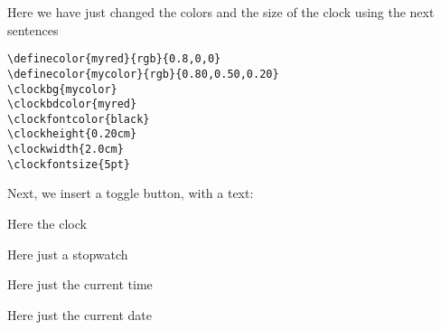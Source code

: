 \documentclass{beamer}
\begin{document}
%
%

\clockheight{0.20cm}
\clockwidth{2.0cm}
\clockfontsize{5pt}


\begin{frame}[fragile]
Here we have just changed the colors and the size of the clock using the next sentences

\begin{verbatim}
\definecolor{myred}{rgb}{0.8,0,0}
\definecolor{mycolor}{rgb}{0.80,0.50,0.20}
\clockbg{mycolor}
\clockbdcolor{myred}
\clockfontcolor{black}
\clockheight{0.20cm}
\clockwidth{2.0cm}
\clockfontsize{5pt}
\end{verbatim}


\end{frame}

\begin{frame}

Next, we insert a toggle button, with a text:

\medskip

\quad {}

\medskip

Here the clock \quad \insertclock

Here just a stopwatch \quad \insertcrono

Here just the current time \quad \inserttime

Here just the current date \quad \insertcurrentdate

\end{frame}
\end{document}
